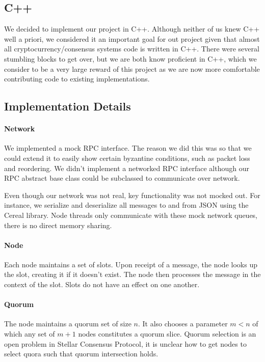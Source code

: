 \documentclass[preprint,11pt]{article}
\begin{document}
\subsection{C++}
We decided to implement our project in C++. Although neither of us
knew C++ well a priori, we considered it an important goal for out
project given that almost all cryptocurrency/consensus systems code is
written in C++. There were several stumbling blocks to get over, but
we are both know proficient in C++, which we consider to be a very large
reward of this project as we are now more comfortable contributing code
to existing implementations.
\subsection{Implementation Details}
\paragraph{Network}
We implemented a mock RPC interface. The reason we did this was so
that we could extend it to easily show certain byzantine conditions,
such as packet loss and reordering. We didn't implement a networked
RPC interface although our RPC abstract base class could be subclassed
to communicate over network.

Even though our network was not real, key functionality was not mocked out.
For instance, we serialize and deserialize all messages to and from JSON using the
Cereal library. Node threads only communicate with these mock network queues, there
is no direct memory sharing.

\paragraph{Node}
Each node maintains a set of slots. Upon receipt of a message, the
node looks up the slot, creating it if it doesn't exist.  The node
then processes the message in the context of the slot. Slots do not have an effect on
one another.

\paragraph{Quorum}
The node maintains a quorum set of size $n$. It also chooses a
parameter $m < n$ of which any set of $m+1$ nodes constitutes a quorum
slice. Quorum selection is an open problem in Stellar Consensus
Protocol, it is unclear how to get nodes to select quora such that
quorum intersection holds.
\end{document}
